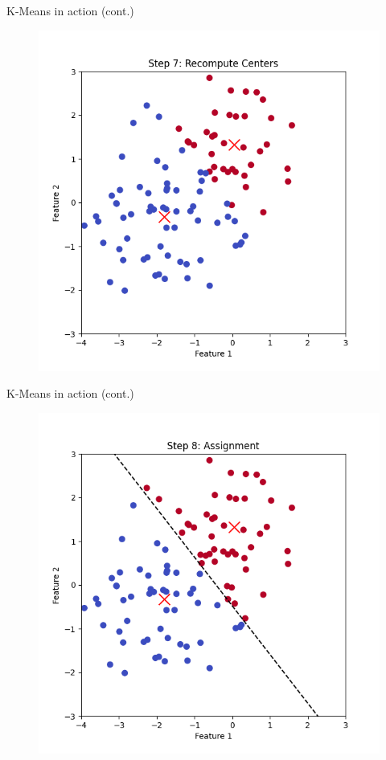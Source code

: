 \documentclass[serif, aspectratio=169]{beamer}
\begin{document}
\begin{frame}{K-Means in action (cont.)}
    \begin{figure}
        \centering
        \includegraphics[scale=0.45]{pic/figs/kmeans_step_7_recompute_centers.png}
    \end{figure}
\end{frame}
\begin{frame}{K-Means in action (cont.)}
    \begin{figure}
        \centering
        \includegraphics[scale=0.45]{pic/figs/kmeans_step_8_assignment.png}
    \end{figure}
\end{frame}
\end{document}
